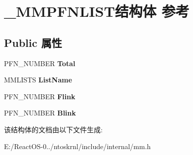 \hypertarget{struct___m_m_p_f_n_l_i_s_t}{}\section{\+\_\+\+M\+M\+P\+F\+N\+L\+I\+S\+T结构体 参考}
\label{struct___m_m_p_f_n_l_i_s_t}
\subsection*{Public 属性}
\begin{DoxyCompactItemize}
\item 
\mbox{\label{struct___m_m_p_f_n_l_i_s_t_a259d23b0dbf92f765c5131a67db58da3}} 
P\+F\+N\+\_\+\+N\+U\+M\+B\+ER {\bfseries Total}
\item 
\mbox{\label{struct___m_m_p_f_n_l_i_s_t_a44ad8b4259d7e9f8a028559e81742d30}} 
M\+M\+L\+I\+S\+TS {\bfseries List\+Name}
\item 
\mbox{\label{struct___m_m_p_f_n_l_i_s_t_a9385406462fedcaffa8c0096a665c228}} 
P\+F\+N\+\_\+\+N\+U\+M\+B\+ER {\bfseries Flink}
\item 
\mbox{\label{struct___m_m_p_f_n_l_i_s_t_a4d751fdba6ac79e71dc208ef9ef94caf}} 
P\+F\+N\+\_\+\+N\+U\+M\+B\+ER {\bfseries Blink}
\end{DoxyCompactItemize}


该结构体的文档由以下文件生成\+:\begin{DoxyCompactItemize}
\item 
E\+:/\+React\+O\+S-\/0../ntoskrnl/include/internal/mm.\+h\end{DoxyCompactItemize}
